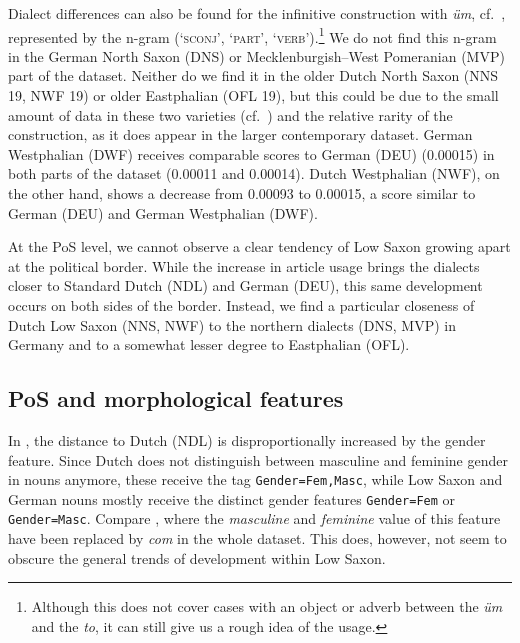 \documentclass[output=paper,colorlinks,citecolor=brown]{langscibook}
\begin{document}
Dialect differences can also be found for the infinitive construction with \textit{üm}, cf.~, represented by the n-gram (`\textsc{sconj}', `\textsc{part}', `\textsc{verb}').\footnote{Although this does not cover cases with an object or adverb between the \textit{üm} and the \textit{to}, it can still give us a rough idea of the usage.} We do not find this n-gram in the German North Saxon (DNS) or Mecklenburgish--West Pomeranian (MVP) part of the dataset. Neither do we find it in the older Dutch North Saxon (NNS 19, NWF 19) or older Eastphalian (OFL 19), but this could be due to the small amount of data in these two varieties (cf.~) and the relative rarity of the construction, as it does appear in the larger contemporary dataset. German Westphalian (DWF) receives comparable scores to German (DEU) (0.00015) in both parts of the dataset (0.00011 and 0.00014). Dutch Westphalian (NWF), on the other hand, shows a decrease from 0.00093 to 0.00015, a score similar to German (DEU) and German Westphalian (DWF).

At the PoS level, we cannot observe a clear tendency of Low Saxon growing apart at the political border. While the increase in article usage brings the dialects closer to Standard Dutch (NDL) and German (DEU), this same development occurs on both sides of the border. Instead, we find a particular closeness of Dutch Low Saxon (NNS, NWF) to the northern dialects (DNS, MVP) in Germany and to a somewhat lesser degree to Eastphalian (OFL).  

\subsection{PoS and morphological features}\label{posmorf-level-results}
%

In , the distance to Dutch (NDL) is disproportionally increased by the gender feature. Since Dutch does not distinguish between masculine and feminine gender in nouns anymore, these receive the tag \texttt{Gender=Fem,Masc}, while Low Saxon and German nouns mostly receive the distinct gender features \texttt{Gender=Fem} or \texttt{Gender=Masc}. Compare , where the \textit{masculine} and \textit{feminine} value of this feature have been replaced by \textit{com} in the whole dataset. This does, however, not seem to obscure the general trends of development within Low Saxon.
\end{document}
